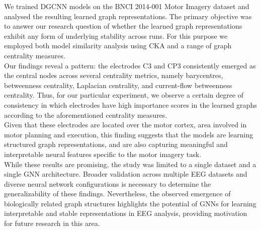 We trained DGCNN models on the BNCI 2014-001 Motor Imagery dataset and analysed the resulting learned graph representations. The primary objective was to answer our research question of whether the learned graph representations exhibit any form of underlying stability across runs. For this purpose we employed both model similarity analysis using CKA and a range of graph centrality measures. 
\vspace{0.5em}\\
Our findings reveal a pattern: the electrodes C3 and CP3 consistently emerged as the central nodes across several centrality metrics, namely barycentres, betweenness centrality, Laplacian centrality, and current-flow betweenness centrality. Thus, for our particular experiment, we observe a certain degree of consistency in which electrodes have high importance scores in the learned graphs according to the aforementioned centrality measures.
\vspace{0.5em}\\
Given that these electrodes are located over the motor cortex, area involved in motor planning and execution, this finding suggests that the models are learning structured graph representations, and are also capturing meaningful and interpretable neural features specific to the motor imagery task.
\vspace{0.5em}\\
While these results are promising, the study was limited to a single dataset and a single GNN architecture. Broader validation across multiple EEG datasets and diverse neural network configurations is necessary to determine the generalizability of these findings. Nevertheless, the observed emergence of biologically related graph structures highlights the potential of GNNs for learning interpretable and stable representations in EEG analysis, providing motivation for future research in this area.